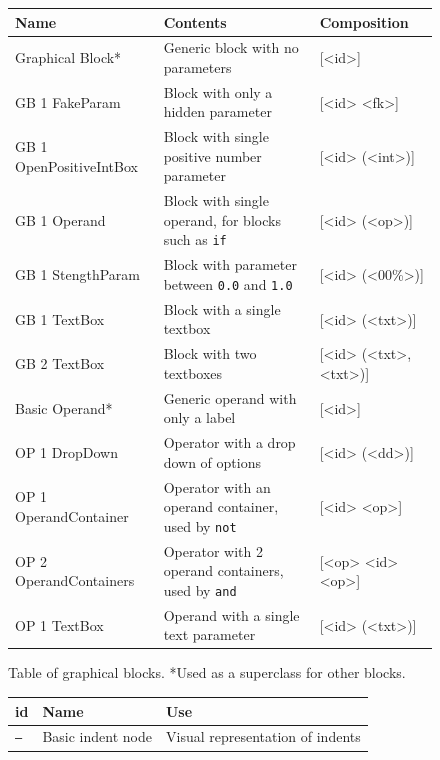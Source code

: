 \begin{fullwidthfigure}
    \centering
    \begin{subfigure}[T]{1\linewidth}
        \centering
        \begin{tabular}{lll}\toprule
             Name & Contents & Composition \\\midrule
             Graphical Block* & Generic block with no parameters & [<id>] \\
             GB 1 FakeParam & Block with only a hidden parameter & [<id> <fk>] \\
             GB 1 OpenPositiveIntBox & Block with single positive number parameter & [<id> (<int>)] \\
             GB 1 Operand & Block with single operand, for blocks such as \texttt{if} & [<id> (<op>)] \\
             GB 1 StengthParam & Block with parameter between \texttt{0.0} and \texttt{1.0} & [<id> (<00\%>)] \\
             GB 1 TextBox & Block with a single textbox & [<id> (<txt>)] \\
             GB 2 TextBox & Block with two textboxes & [<id> (<txt>,<txt>)] \\ \midrule
             Basic Operand* & Generic operand with only a label & [<id>] \\
             OP 1 DropDown & Operator with a drop down of options & [<id> (<dd>)] \\
             OP 1 OperandContainer & Operator with an operand container, used by \texttt{not} & [<id> <op>] \\
             OP 2 OperandContainers & Operator with 2 operand containers, used by \texttt{and} & [<op> <id> <op>] \\
             OP 1 TextBox & Operand with a single text parameter & [<id> (<txt>)]
        \\ \bottomrule\end{tabular}
        \caption[Table of graphical blocks]{Table of graphical blocks. *Used as a superclass for other blocks.}
        \label{fig:design/catCode-graphicalBlocksAndComponents-A}
    \end{subfigure}
    \begin{subfigure}[T]{0.6\linewidth}
        \centering
        \begin{tabular}{lll}\toprule
            id & Name & Use \\\midrule
            \texttt{--} & Basic indent node & Visual representation of indents \\

\end{tabular}
\end{subfigure}
\end{fullwidthfigure}
